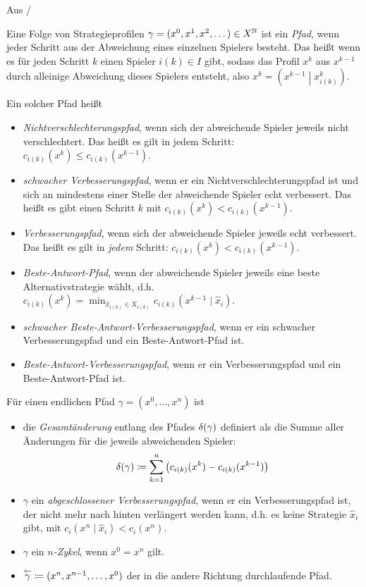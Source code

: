 Aus \cite{MonShap}/\cite{BestRespPot}

\begin{defn}
	Eine Folge von Strategieprofilen $\gamma = (x^0, x^1, x^2, \dots) \in X^{\mathbb{N}}$ ist ein \emph{Pfad}, wenn jeder Schritt aus der Abweichung eines einzelnen Spielers besteht. Das heißt wenn es für jeden Schritt $k$ einen Spieler $i(k) \in I$ gibt, sodass das Profil $x^{k}$ aus $x^{k-1}$ durch alleinige Abweichung dieses Spielers entsteht, also $x^{k} = \left(x^{k-1} \middle| x^{k}_{i(k)}\right)$.
	
	Ein solcher Pfad heißt
	\begin{itemize}
		\item \emph{Nichtverschlechterungspfad}, wenn sich der abweichende Spieler jeweils nicht verschlechtert. Das heißt es gilt in jedem Schritt: $c_{i(k)}(x^{k}) \leq c_{i(k)}(x^{k-1})$.
		\item \emph{schwacher Verbesserungspfad}, wenn er ein Nichtverschlechterungspfad ist und sich an mindestens einer Stelle der abweichende Spieler echt verbessert. Das heißt es gibt einen Schritt $k$ mit $c_{i(k)}(x^k) < c_{i(k)}(x^{k-1})$.
		\item \emph{Verbesserungspfad}, wenn sich der abweichende Spieler jeweils echt verbessert. Das heißt es gilt in \emph{jedem} Schritt: $c_{i(k)}(x^k) < c_{i(k)}(x^{k-1})$.
		\item \emph{Beste-Antwort-Pfad}, wenn der abweichende Spieler jeweils eine beste Alternativstrategie wählt, d.h. $c_{i(k)}(x^k) = \min_{\hat{x}_{i(k)} \in X_{i(k)}} c_{i(k)}(x^{k-1} \mid \hat{x}_i)$.
		\item \emph{schwacher Beste-Antwort-Verbesserungspfad}, wenn er ein schwacher Verbesserungspfad und ein Beste-Antwort-Pfad ist.
		\item \emph{Beste-Antwort-Verbesserungspfad}, wenn er ein Verbesserungspfad und ein Beste-Antwort-Pfad ist.
	\end{itemize}
	
	Für einen endlichen Pfad $\gamma = (x^0, \dots, x^n)$ ist
	\begin{itemize}
		\item die \emph{Gesamtänderung} entlang des Pfades $\delta(\gamma)$ definiert als die Summe aller Änderungen für die jeweils abweichenden Spieler:
		\[\delta(\gamma) \coloneqq \sum_{k=1}^{n} \left(c_{i(k)}(x^k) - c_{i(k)}(x^{k-1})\right) \]
		\item $\gamma$ ein \emph{abgeschlossener Verbesserungspfad}, wenn er ein Verbesserungspfad ist, der nicht mehr nach hinten verlängert werden kann, d.h. es keine Strategie $\hat{x}_i$ gibt, mit $c_{i}(x^n \mid \hat{x}_i) < c_{i}(x^n)$.
		\item $\gamma$ ein \emph{$n$-Zykel}, wenn $x^0 = x^n$ gilt.
		\item $\overset{\leftarrow}{\gamma} \coloneqq (x^n, x^{n-1}, \dots, x^0)$ der in die andere Richtung durchlaufende Pfad.
	\end{itemize}


\end{defn}
